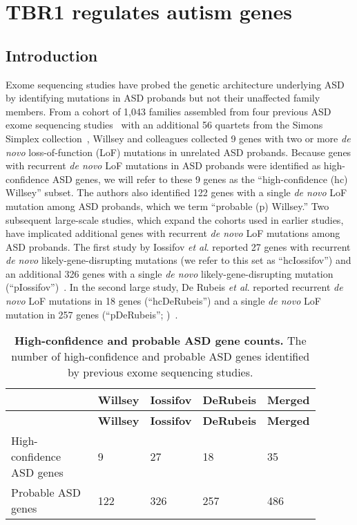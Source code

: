 \chapter{TBR1 regulates autism genes}
\label{chap:autism}

\section{Introduction}

Exome sequencing studies have probed the genetic architecture underlying
ASD by identifying mutations in ASD probands but not their unaffected
family members. From a cohort of 1,043 families assembled from four
previous ASD exome sequencing studies~\citep{Iossifov:2012bd, Kong:2012ek, Neale:2012ki, ORoak:2012kb} with an additional 56
quartets from the Simons Simplex collection~\citep{Willsey:2013bd},
Willsey and colleagues collected 9 genes with two or more \emph{de novo}
loss-of-function (LoF) mutations in unrelated ASD probands. Because
genes with recurrent \emph{de novo} LoF mutations in ASD probands were
identified as high-confidence ASD genes, we will refer to these 9 genes
as the ``high-confidence (hc) Willsey'' subset. The authors also
identified 122 genes with a single \emph{de novo} LoF mutation among ASD
probands, which we term ``probable (p) Willsey.'' Two subsequent
large-scale studies, which expand the cohorts used in earlier studies,
have implicated additional genes with recurrent \emph{de novo} LoF
mutations among ASD probands. The first study by Iossifov \emph{et al}.
reported 27 genes with recurrent \emph{de novo} likely-gene-disrupting
mutations (we refer to this set as ``hcIossifov'') and an additional 326
genes with a single \emph{de novo} likely-gene-disrupting mutation
(``pIossifov'')~\citep{Iossifov:2014if}. In the second large study, De
Rubeis \emph{et al}. reported recurrent \emph{de novo} LoF mutations in
18 genes (``hcDeRubeis'') and a single \emph{de novo} LoF mutation in
257 genes (``pDeRubeis''; )~\citep{DeRubeis:2014cw}.

\begin{center}
\begin{longtable}
{@{}p{0.29\linewidth}p{0.15\linewidth}p{0.15\linewidth}p{0.15\linewidth}p{0.15\linewidth}@{}}
\caption[High-confidence and probable ASD gene counts]{{\bf High-confidence and probable ASD gene counts.}
The number of
high-confidence and probable ASD genes identified by previous exome
sequencing studies.
}
\label{tab:autismTab1} \\

\hline ~ & \textbf{Willsey} & \textbf{Iossifov} & \textbf{DeRubeis} & \textbf{Merged} \\ \hline 
\endfirsthead

\hline ~ & \textbf{Willsey} & \textbf{Iossifov} & \textbf{DeRubeis} & \textbf{Merged} \\ \hline 
\endhead

\hline
\endlastfoot

High-confidence ASD genes & 9 & 27 & 18 & 35\tabularnewline
Probable ASD genes & 122 & 326 & 257 & 486\tabularnewline
\end{longtable}
\end{center}

